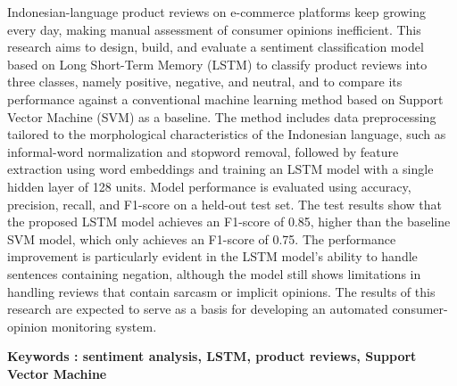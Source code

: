 

\noindent Indonesian-language product reviews on e-commerce platforms keep
growing every day, making manual assessment of consumer opinions
inefficient. This research aims to design, build, and evaluate a
sentiment classification model based on Long Short-Term Memory
(LSTM) to classify product reviews into three classes, namely
positive, negative, and neutral, and to compare its performance
against a conventional machine learning method based on Support
Vector Machine (SVM) as a baseline. The method includes data
preprocessing tailored to the morphological characteristics of the
Indonesian language, such as informal-word normalization and
stopword removal, followed by feature extraction using word
embeddings and training an LSTM model with a single hidden layer of
128 units. Model performance is evaluated using accuracy, precision,
recall, and F1-score on a held-out test set. The test results show
that the proposed LSTM model achieves an F1-score of 0.85, higher
than the baseline SVM model, which only achieves an F1-score of
0.75. The performance improvement is particularly evident in the
LSTM model's ability to handle sentences containing negation,
although the model still shows limitations in handling reviews that
contain sarcasm or implicit opinions. The results of this research
are expected to serve as a basis for developing an automated
consumer-opinion monitoring system.

\baselineskip
\noindent\textbf{Keywords : sentiment analysis, LSTM, product reviews,
Support Vector Machine}
